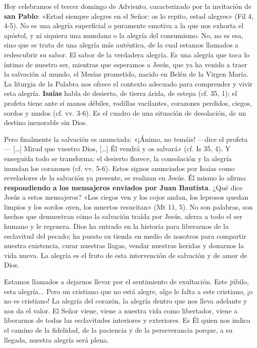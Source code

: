 \documentclass[]{article}
\begin{document}
Hoy celebramos el tercer domingo de Adviento, caracterizado por la
invitación de \textbf{san Pablo}: «Estad siempre alegres en el Señor: os
lo repito, estad alegres» (Fil 4, 4-5). No es una alegría superficial o
puramente emotiva a la que nos exhorta el apóstol, y ni siquiera una
mundana o la alegría del consumismo. No, no es esa, sino que se trata de
una alegría más auténtica, de la cual estamos llamados a redescubrir su
sabor. El sabor de la verdadera alegría. Es una alegría que toca lo
íntimo de nuestro ser, mientras que esperamos a Jesús, que ya ha venido
a traer la salvación al mundo, el Mesías prometido, nacido en Belén de
la Virgen María. La liturgia de la Palabra nos ofrece el contexto
adecuado para comprender y vivir esta alegría. \textbf{Isaías} habla de
desierto, de tierra árida, de estepa (cf. 35, 1); el profeta tiene ante
sí manos débiles, rodillas vacilantes, corazones perdidos, ciegos,
sordos y mudos (cf. vv. 3-6). Es el cuadro de una situación de
desolación, de un destino inexorable sin Dios.

Pero finalmente la salvación es anunciada: «¡Ánimo, no temáis! ---dice
el profeta--- [\ldots{}] Mirad que vuestro Dios, [\ldots{}] Él vendrá y os
salvará» (cf. Is 35, 4). Y enseguida todo se transforma: el desierto
florece, la consolación y la alegría inundan los corazones (cf. vv.
5-6). Estos signos anunciados por Isaías como reveladores de la
salvación ya presente, se realizan en Jesús. Él mismo lo afirma
\textbf{respondiendo a los mensajeros enviados por Juan Bautista}. ¿Qué
dice Jesús a estos mensajeros? «Los ciegos ven y los cojos andan, los
leprosos quedan limpios y los sordos oyen, los muertos resucitan» (Mt
11, 5). No son palabras, son hechos que demuestran cómo la salvación
traída por Jesús, aferra a todo el ser humano y le regenera. Dios ha
entrado en la historia para liberarnos de la esclavitud del pecado; ha
puesto su tienda en medio de nosotros para compartir nuestra existencia,
curar nuestras llagas, vendar nuestras heridas y donarnos la vida nueva.
La alegría es el fruto de esta intervención de salvación y de amor de
Dios.

Estamos llamados a dejarnos llevar por el sentimiento de exultación.
Este júbilo, esta alegría... Pero un cristiano que no está alegre, algo
le falta a este cristiano, ¡o no es cristiano! La alegría del corazón,
la alegría dentro que nos lleva adelante y nos da el valor. El Señor
viene, viene a nuestra vida como libertador, viene a liberarnos de todas
las esclavitudes interiores y exteriores. Es Él quien nos indica el
camino de la fidelidad, de la paciencia y de la perseverancia porque, a
su llegada, nuestra alegría será plena.
\end{document}
